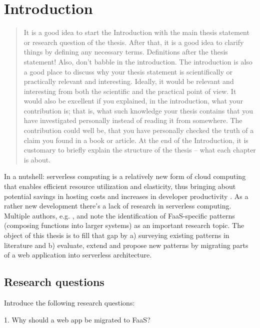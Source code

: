 \documentclass[utf8,english]{gradu3}
\begin{document}
\mainmatter

\chapter{Introduction}

\begin{quote}
It is a good idea to start the Introduction with the main thesis statement or research question of the thesis.  After that, it is a good idea to clarify things by defining any necessary terms. Definitions after the thesis statement!  Also, don't babble in the introduction. The introduction is also a good place to discuss why your thesis statement is scientifically or practically relevant and interesting.  Ideally, it would be relevant and interesting from both the scientific and the practical point of view. It would also be excellent if you explained, in the introduction, what your contribution is; that is, what such knowledge your thesis contains that you have investigated personally instead of reading it from somewhere. The contribution could well be, that you have personally checked the truth of a claim you found in a book or article.  At the end of the Introduction, it is customary to briefly explain the structure of the thesis -- what each chapter is about.
\end{quote}

In a nutshell: serverless computing is a relatively new form of cloud computing that enables efficient resource utilization and elasticity, thus bringing about potential savings in hosting costs and increases in developer productivity \parencite{robert2016serverlessarchitectures}. As a rather new development there's a lack of research in serverless computing. Multiple authors, e.g. \textcite{baldini17currentTrends}, \textcite{fox17} and \textcite{van2017spec} note the identification of FaaS-specific patterns (composing functions into larger systems) as an important research topic. The object of this thesis is to fill that gap by a) surveying existing patterns in literature and b) evaluate, extend and propose new patterns by migrating parts of a web application into serverless architecture.

\section{Research questions}

Introduce the following research questions:

1. Why should a web app be migrated to FaaS?
\end{document}
